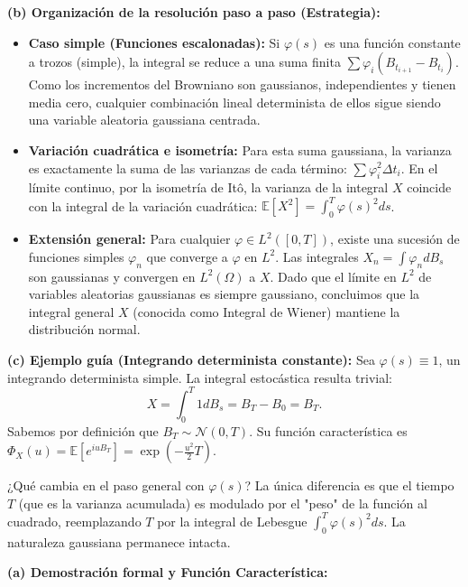 \documentclass[11pt, letterpaper]{article}
\begin{document}
\begin{solucion}
    \textbf{(b) Organización de la resolución paso a paso (Estrategia):}
    \begin{itemize}
        \item[(i)] \textbf{Caso simple (Funciones escalonadas):} Si $\varphi(s)$ es una función constante a trozos (simple), la integral se reduce a una suma finita $\sum \varphi_i (B_{t_{i+1}} - B_{t_i})$. Como los incrementos del Browniano son gaussianos, independientes y tienen media cero, cualquier combinación lineal determinista de ellos sigue siendo una variable aleatoria gaussiana centrada.
        \item[(ii)] \textbf{Variación cuadrática e isometría:} Para esta suma gaussiana, la varianza es exactamente la suma de las varianzas de cada término: $\sum \varphi_i^2 \Delta t_i$. En el límite continuo, por la isometría de Itô, la varianza de la integral $X$ coincide con la integral de la variación cuadrática: $\mathbb{E}[X^2] = \int_0^T \varphi(s)^2 ds$.
        \item[(iii)] \textbf{Extensión general:} Para cualquier $\varphi \in L^2([0,T])$, existe una sucesión de funciones simples $\varphi_n$ que converge a $\varphi$ en $L^2$. Las integrales $X_n = \int \varphi_n dB_s$ son gaussianas y convergen en $L^2(\Omega)$ a $X$. Dado que el límite en $L^2$ de variables aleatorias gaussianas es siempre gaussiano, concluimos que la integral general $X$ (conocida como Integral de Wiener) mantiene la distribución normal.
    \end{itemize}

    \vspace{3mm}
    \textbf{(c) Ejemplo guía (Integrando determinista constante):}
    Sea $\varphi(s) \equiv 1$, un integrando determinista simple. 
    La integral estocástica resulta trivial:
    \[ X = \int_0^T 1 dB_s = B_T - B_0 = B_T. \]
    Sabemos por definición que $B_T \sim \mathcal{N}(0, T)$. 
    Su función característica es $\Phi_X(u) = \mathbb{E}[e^{iuB_T}] = \exp\left(-\frac{u^2}{2}T\right)$.
    
    ¿Qué cambia en el paso general con $\varphi(s)$?
    La única diferencia es que el tiempo $T$ (que es la varianza acumulada) es modulado por el "peso" de la función al cuadrado, reemplazando $T$ por la integral de Lebesgue $\int_0^T \varphi(s)^2 ds$. La naturaleza gaussiana permanece intacta.

    \vspace{3mm}
    \textbf{(a) Demostración formal y Función Característica:}


\end{solucion}
\end{document}
